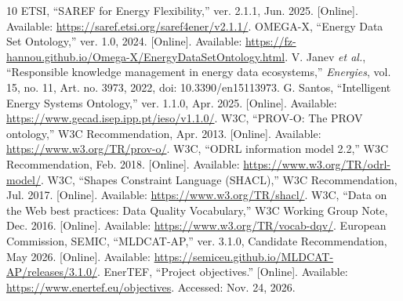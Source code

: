 \documentclass[conference]{IEEEtran}
\begin{document}
\begin{thebibliography}{10}
 ETSI, ``SAREF for Energy Flexibility,'' ver. 2.1.1, Jun. 2025. [Online]. Available: \url{https://saref.etsi.org/saref4ener/v2.1.1/}.
 OMEGA-X, ``Energy Data Set Ontology,'' ver. 1.0, 2024. [Online]. Available: \url{https://fz-hannou.github.io/Omega-X/EnergyDataSetOntology.html}.
 V. Janev \emph{et al.}, ``Responsible knowledge management in energy data ecosystems,'' \emph{Energies}, vol. 15, no. 11, Art. no. 3973, 2022, doi: 10.3390/en15113973.
 G. Santos, ``Intelligent Energy Systems Ontology,'' ver. 1.1.0, Apr. 2025. [Online]. Available: \url{https://www.gecad.isep.ipp.pt/ieso/v1.1.0/}.
 W3C, ``PROV-O: The PROV ontology,'' W3C Recommendation, Apr. 2013. [Online]. Available: \url{https://www.w3.org/TR/prov-o/}.
 W3C, ``ODRL information model 2.2,'' W3C Recommendation, Feb. 2018. [Online]. Available: \url{https://www.w3.org/TR/odrl-model/}.
 W3C, ``Shapes Constraint Language (SHACL),'' W3C Recommendation, Jul. 2017. [Online]. Available: \url{https://www.w3.org/TR/shacl/}.
 W3C, ``Data on the Web best practices: Data Quality Vocabulary,'' W3C Working Group Note, Dec. 2016. [Online]. Available: \url{https://www.w3.org/TR/vocab-dqv/}.
 European Commission, SEMIC, ``MLDCAT-AP,'' ver. 3.1.0, Candidate Recommendation, May 2026. [Online]. Available: \url{https://semiceu.github.io/MLDCAT-AP/releases/3.1.0/}.
 EnerTEF, ``Project objectives.'' [Online]. Available: \url{https://www.enertef.eu/objectives}. Accessed: Nov. 24, 2026.
\end{thebibliography}
\end{document}
